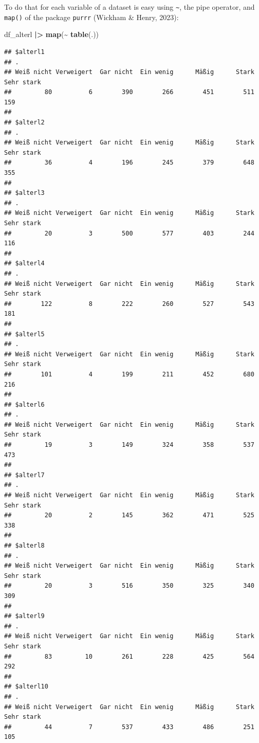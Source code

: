 \documentclass[
  doc]{apa6}
\newenvironment{Shaded}{\begin{snugshade}}{\end{snugshade}}
\newcommand{\FunctionTok}[1]{\textcolor[rgb]{0.13,0.29,0.53}{\textbf{#1}}}
\newcommand{\NormalTok}[1]{#1}
\newcommand{\SpecialCharTok}[1]{\textcolor[rgb]{0.81,0.36,0.00}{\textbf{#1}}}
\begin{document}
To do that for each variable of a dataset is easy using \texttt{\textasciitilde{}}, the pipe operator, and \texttt{map()} of the package \texttt{purrr} (Wickham \& Henry, 2023):

\begin{Shaded}
\begin{Highlighting}[]
\NormalTok{df\_alterl }\SpecialCharTok{|\textgreater{}} 
  \FunctionTok{map}\NormalTok{(}\SpecialCharTok{\textasciitilde{}} \FunctionTok{table}\NormalTok{(.))}
\end{Highlighting}
\end{Shaded}

\begin{verbatim}
## $alterl1
## .
## Weiß nicht Verweigert  Gar nicht  Ein wenig      Mäßig      Stark Sehr stark 
##         80          6        390        266        451        511        159 
## 
## $alterl2
## .
## Weiß nicht Verweigert  Gar nicht  Ein wenig      Mäßig      Stark Sehr stark 
##         36          4        196        245        379        648        355 
## 
## $alterl3
## .
## Weiß nicht Verweigert  Gar nicht  Ein wenig      Mäßig      Stark Sehr stark 
##         20          3        500        577        403        244        116 
## 
## $alterl4
## .
## Weiß nicht Verweigert  Gar nicht  Ein wenig      Mäßig      Stark Sehr stark 
##        122          8        222        260        527        543        181 
## 
## $alterl5
## .
## Weiß nicht Verweigert  Gar nicht  Ein wenig      Mäßig      Stark Sehr stark 
##        101          4        199        211        452        680        216 
## 
## $alterl6
## .
## Weiß nicht Verweigert  Gar nicht  Ein wenig      Mäßig      Stark Sehr stark 
##         19          3        149        324        358        537        473 
## 
## $alterl7
## .
## Weiß nicht Verweigert  Gar nicht  Ein wenig      Mäßig      Stark Sehr stark 
##         20          2        145        362        471        525        338 
## 
## $alterl8
## .
## Weiß nicht Verweigert  Gar nicht  Ein wenig      Mäßig      Stark Sehr stark 
##         20          3        516        350        325        340        309 
## 
## $alterl9
## .
## Weiß nicht Verweigert  Gar nicht  Ein wenig      Mäßig      Stark Sehr stark 
##         83         10        261        228        425        564        292 
## 
## $alterl10
## .
## Weiß nicht Verweigert  Gar nicht  Ein wenig      Mäßig      Stark Sehr stark 
##         44          7        537        433        486        251        105
\end{verbatim}
\end{document}
